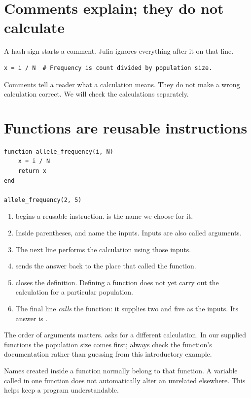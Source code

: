 \section{Comments explain; they do not calculate}
A hash sign starts a comment. Julia ignores everything after it on that line.
\begin{lstlisting}
x = i / N  # Frequency is count divided by population size.
\end{lstlisting}
Comments tell a reader what a calculation means. They do not make a wrong calculation correct. We will check the calculations separately.

\section{Functions are reusable instructions}
\begin{lstlisting}
function allele_frequency(i, N)
    x = i / N
    return x
end

allele_frequency(2, 5)
\end{lstlisting}

\begin{enumerate}
\item {} begins a reusable instruction.  is the name we choose for it.
\item Inside parentheses,  and  name the inputs. Inputs are also called arguments.
\item The next line performs the calculation using those inputs.
\item {} sends the answer back to the place that called the function.
\item {} closes the definition. Defining a function does not yet carry out the calculation for a particular population.
\item The final line \emph{calls} the function: it supplies two and five as the inputs. Its answer is .
\end{enumerate}

The order of arguments matters.  asks for a different calculation. In our supplied functions the population size comes first; always check the function's documentation rather than guessing from this introductory example.

Names created inside a function normally belong to that function. A variable called  in one function does not automatically alter an unrelated  elsewhere. This helps keep a program understandable.

